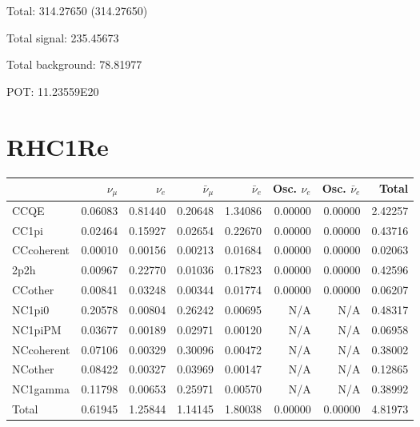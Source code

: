 \documentclass[10pt,a4paper]{article}
\begin{document}
Total: 314.27650    (314.27650)


Total signal: 235.45673


Total background: 78.81977

POT: 11.23559E20


\section*{RHC1Re}
\begin{tabular} { | l ||r | r | r | r | r | r | | r | }
\hline
              & $\nu_\mu$            & $\nu_e$              & $\bar{\nu}_{\mu}$    & $\bar{\nu}_{e}$      & Osc. $\nu_e$         & Osc. $\bar{\nu}_{e}$ & Total                \\ \hline\hline
 CCQE         & 0.06083              & 0.81440              & 0.20648              & 1.34086              & 0.00000              & 0.00000              & 2.42257              \\ \hline
 CC1pi        & 0.02464              & 0.15927              & 0.02654              & 0.22670              & 0.00000              & 0.00000              & 0.43716              \\ \hline
 CCcoherent   & 0.00010              & 0.00156              & 0.00213              & 0.01684              & 0.00000              & 0.00000              & 0.02063              \\ \hline
 2p2h         & 0.00967              & 0.22770              & 0.01036              & 0.17823              & 0.00000              & 0.00000              & 0.42596              \\ \hline
 CCother      & 0.00841              & 0.03248              & 0.00344              & 0.01774              & 0.00000              & 0.00000              & 0.06207              \\ \hline
 NC1pi0       & 0.20578              & 0.00804              & 0.26242              & 0.00695              & N/A                  & N/A                  & 0.48317              \\ \hline
 NC1piPM      & 0.03677              & 0.00189              & 0.02971              & 0.00120              & N/A                  & N/A                  & 0.06958              \\ \hline
 NCcoherent   & 0.07106              & 0.00329              & 0.30096              & 0.00472              & N/A                  & N/A                  & 0.38002              \\ \hline
 NCother      & 0.08422              & 0.00327              & 0.03969              & 0.00147              & N/A                  & N/A                  & 0.12865              \\ \hline
 NC1gamma     & 0.11798              & 0.00653              & 0.25971              & 0.00570              & N/A                  & N/A                  & 0.38992              \\ \hline
\hline
 Total        & 0.61945              & 1.25844              & 1.14145              & 1.80038              & 0.00000              & 0.00000              & 4.81973              \\ \hline

\end{tabular}
\end{document}
